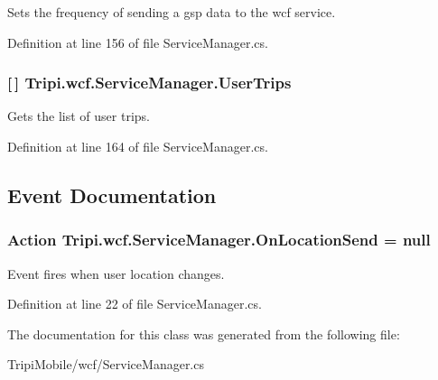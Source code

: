 Sets the frequency of sending a gsp data to the wcf service. 

Definition at line 156 of file ServiceManager.cs.\hypertarget{class_tripi_1_1wcf_1_1_service_manager_aa00ae9a25006f981fedf1fac417798e2}{
\subsubsection[{UserTrips}]{ \mbox{[}$\,$\mbox{]} Tripi.wcf.ServiceManager.UserTrips}}
\label{class_tripi_1_1wcf_1_1_service_manager_aa00ae9a25006f981fedf1fac417798e2}


Gets the list of user trips. 

Definition at line 164 of file ServiceManager.cs.

\subsection{Event Documentation}
\hypertarget{class_tripi_1_1wcf_1_1_service_manager_a81275d9601585a2a30ccbc7841fad81e}{
\subsubsection[{OnLocationSend}]{\setlength{\rightskip}{0pt plus 5cm}Action Tripi.wcf.ServiceManager.OnLocationSend = null}}
\label{class_tripi_1_1wcf_1_1_service_manager_a81275d9601585a2a30ccbc7841fad81e}


Event fires when user location changes. 

Definition at line 22 of file ServiceManager.cs.

The documentation for this class was generated from the following file:\begin{DoxyCompactItemize}
\item 
TripiMobile/wcf/ServiceManager.cs\end{DoxyCompactItemize}
